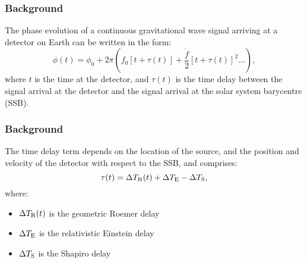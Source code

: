 
\def\mytitle{Reduced Order Modelling for Solar System Barycentring}
\def\mydate{10 July 2017}
\def\myauthor{Matthew Pitkin}
\def\affiliation{University of Glasgow}
\def\latexxslt{beamer}
\def\latexmode{beamer}
\def\theme{m}
\def\event{LVC CW group}



%


\begin{frame}

\frametitle{Background}
\label{background}

The phase evolution of a continuous gravitational wave signal arriving at a detector on
Earth can be written in the form:
\[
\phi(t) = \phi_0 + 2\pi \left(f_0\left[t+\tau(t)\right] + \frac{\dot{f}}{2}\left[t + \tau(t)\right]^2 \ldots \right),
\]
where $t$ is the time at the detector, and $\tau(t)$ is the time delay between the signal arrival
at the detector and the signal arrival at the solar system barycentre (SSB).

\end{frame}

\begin{frame}

\frametitle{Background}
\label{background}

The time delay term depends on the location of the source, and the position and velocity of the detector with
respect to the SSB, and comprises:
\[
\tau(t) = \Delta T_{\rm R}(t) + \Delta T_{\rm E} - \Delta T_{\rm S}, 
\]
where:

\begin{itemize}
\item $\Delta T_{\rm R}(t)$ is the geometric Roemer delay

\item $\Delta T_{\rm E}$ is the relativistic Einstein delay

\item $\Delta T_{\rm S}$ is the Shapiro delay

\end{itemize}

\end{frame}

